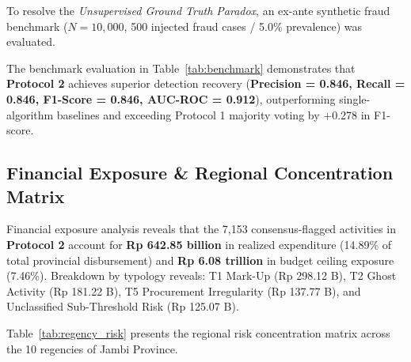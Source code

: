 \documentclass[runningheads]{llncs}
\begin{document}
To resolve the \textit{Unsupervised Ground Truth Paradox}, an ex-ante synthetic fraud benchmark ($N=10,000$, 500 injected fraud cases / 5.0\% prevalence) was evaluated.

\begin{table}[htbp]
\centering
\caption{Synthetic Fraud Injection Benchmark Evaluation Metrics ($N=10,000$, 500 injected fraud cases)}
\label{tab:benchmark}
\end{table}

The benchmark evaluation in Table~\ref{tab:benchmark} demonstrates that \textbf{Protocol 2} achieves superior detection recovery (\textbf{Precision = 0.846, Recall = 0.846, F1-Score = 0.846, AUC-ROC = 0.912}), outperforming single-algorithm baselines and exceeding Protocol 1 majority voting by +0.278 in F1-score.

\subsection{Financial Exposure \& Regional Concentration Matrix}

Financial exposure analysis reveals that the 7,153 consensus-flagged activities in \textbf{Protocol 2} account for \textbf{Rp 642.85 billion} in realized expenditure (14.89\% of total provincial disbursement) and \textbf{Rp 6.08 trillion} in budget ceiling exposure (7.46\%). Breakdown by typology reveals: T1 Mark-Up (Rp 298.12 B), T2 Ghost Activity (Rp 181.22 B), T5 Procurement Irregularity (Rp 137.77 B), and Unclassified Sub-Threshold Risk (Rp 125.07 B).

Table~\ref{tab:regency_risk} presents the regional risk concentration matrix across the 10 regencies of Jambi Province.
\end{document}
